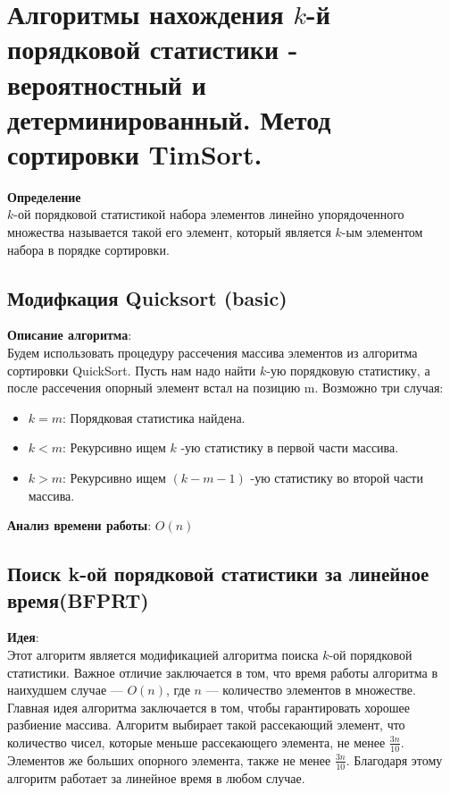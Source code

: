 \section {Алгоритмы нахождения $k$-й порядковой статистики - вероятностный и детерминированный.
Метод сортировки TimSort.}

\noindent\textbf{Определение}\\
$k$-ой порядковой статистикой набора элементов линейно упорядоченного множества называется такой его элемент, который является $k$-ым элементом набора в порядке сортировки.

\subsection{Модифкация Quicksort (basic)}
\noindent\textbf{Описание алгоритма}:\\
Будем использовать процедуру рассечения массива элементов из алгоритма сортировки QuickSort. Пусть нам надо найти $k$-ую порядковую статистику, а после рассечения опорный элемент встал на позицию m. Возможно три случая:
\begin{itemize}
    \item $k = m$: Порядковая статистика найдена.
    \item $k < m$: Рекурсивно ищем $k$ -ую статистику в первой части массива.
	\item $k > m$: Рекурсивно ищем $(k - m -1)$ -ую статистику во второй части массива.
\end{itemize}
\noindent\textbf{Анализ времени работы}: $O(n)$
\subsection{Поиск k-ой порядковой статистики за линейное время(BFPRT)}

\noindent\textbf{Идея}:\\
Этот алгоритм является модификацией алгоритма поиска $k$-ой порядковой статистики. Важное отличие заключается в том, что время работы алгоритма в наихудшем случае — $O(n)$, где $n$ — количество элементов в множестве. Главная идея алгоритма заключается в том, чтобы гарантировать хорошее разбиение массива. Алгоритм выбирает такой рассекающий элемент, что количество чисел, которые меньше рассекающего элемента, не менее $\frac{3n}{10}$. Элементов же больших опорного элемента, также не менее $\frac{3n}{10}$. Благодаря этому алгоритм работает за линейное время в любом случае. 

